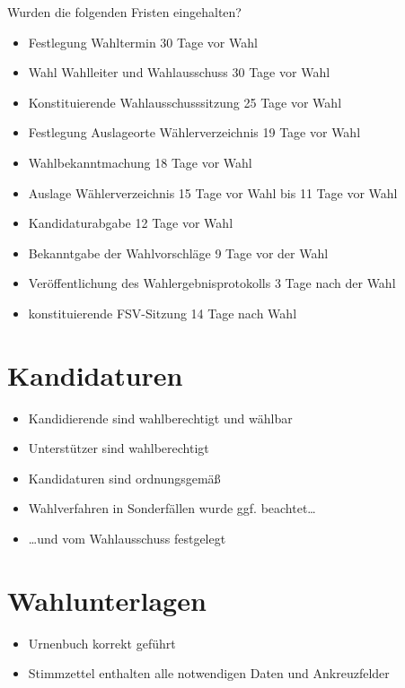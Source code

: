 \documentclass[a4paper]{scrartcl}
\begin{document}
Wurden die folgenden Fristen eingehalten?

\begin{itemize}[label=$\Box$]
\item Festlegung Wahltermin 30 Tage vor Wahl
\item Wahl Wahlleiter und Wahlausschuss 30 Tage vor Wahl
\item Konstituierende Wahlausschusssitzung 25 Tage vor Wahl
\item Festlegung Auslageorte Wählerverzeichnis 19 Tage vor Wahl
\item Wahlbekanntmachung 18 Tage vor Wahl
\item Auslage Wählerverzeichnis 15 Tage vor Wahl bis 11 Tage vor Wahl
\item Kandidaturabgabe 12 Tage vor Wahl
\item Bekanntgabe der Wahlvorschläge 9 Tage vor der Wahl
\item Veröffentlichung des Wahlergebnisprotokolls 3 Tage nach der Wahl
\item konstituierende FSV-Sitzung 14 Tage nach Wahl
\end{itemize}


\section{Kandidaturen}
\begin{itemize}[label=$\Box$]
\item Kandidierende sind wahlberechtigt und wählbar
\item Unterstützer sind wahlberechtigt
\item Kandidaturen sind ordnungsgemäß
\item Wahlverfahren in Sonderfällen wurde ggf. beachtet\dots
\item \dots und vom Wahlausschuss festgelegt
\end{itemize}


\section{Wahlunterlagen}
\begin{itemize}[label=$\Box$]
\item Urnenbuch korrekt geführt
\item Stimmzettel enthalten alle notwendigen Daten und Ankreuzfelder
\end{itemize}
\end{document}
